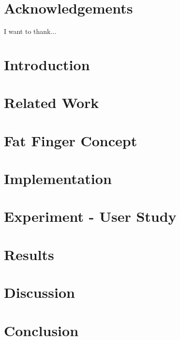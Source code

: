 \documentclass[10pt,twoside]{report}
\begin{document}
\chapter*{Acknowledgements}
I want to thank...

\cleardoublepage
\tableofcontents
\cleardoublepage
\listoffigures
\cleardoublepage
\listoftables
\cleardoublepage


\pagestyle{fancy}

\chapter{Introduction}

\cleardoublepage

\chapter{Related Work}

\cleardoublepage

\chapter{Fat Finger Concept}

\cleardoublepage

\chapter{Implementation}
\label{sec:Implementation}

\cleardoublepage

\chapter{Experiment - User Study}
\label{sec:Experiment}

\cleardoublepage


\chapter{Results}
\label{sec:Results}

\cleardoublepage


\chapter{Discussion}
\label{sec:Discussion}

\cleardoublepage

\chapter{Conclusion}

\cleardoublepage


\cleardoublepage

\appendix

\end{document}
